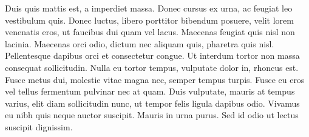 \documentclass[german,nofoldingmark,justifyfile:///home/anke/Git/latex-letter/letter.tex
]{tfbrief}
\date{\today}
\begin{document}
\begin{letter}

%
%

Duis quis mattis est, a imperdiet massa. Donec cursus ex urna, ac feugiat leo vestibulum quis. Donec luctus, libero porttitor bibendum posuere, velit lorem venenatis eros, ut faucibus dui quam vel lacus. Maecenas feugiat quis nisl non lacinia. Maecenas orci odio, dictum nec aliquam quis, pharetra quis nisl. Pellentesque dapibus orci et consectetur congue. Ut interdum tortor non massa consequat sollicitudin. Nulla eu tortor tempus, vulputate dolor in, rhoncus est. Fusce metus dui, molestie vitae magna nec, semper tempus turpis. Fusce eu eros vel tellus fermentum pulvinar nec at quam. Duis vulputate, mauris at tempus varius, elit diam sollicitudin nunc, ut tempor felis ligula dapibus odio. Vivamus eu nibh quis neque auctor suscipit. Mauris in urna purus. Sed id odio ut lectus suscipit dignissim.

\end{letter}

\enlargethispage{1cm} %
\end{document}

